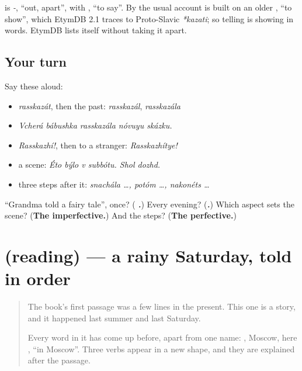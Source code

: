 \begin{cousinweb}
\textbf{} is \emph{-}, \textquotedblleft{}out, apart\textquotedblright{}, with \textbf{}, \textquotedblleft{}to say\textquotedblright{}. By the usual account \emph{} is built on an older \emph{}, \textquotedblleft{}to show\textquotedblright{}, which EtymDB 2.1 traces to Proto-Slavic \emph{*kazati}; so telling is showing in words. EtymDB lists \emph{} itself without taking it apart.
\end{cousinweb}

\subsection*{Your turn}
Say these aloud:

\begin{itemize}
\raggedright
  \item \emph{rasskazát}, then the past: \emph{rasskazál}, \emph{rasskazála}
  \item \emph{Vcherá bábushka rasskazála nóvuyu skázku.}
  \item \emph{Rasskazhí!}, then to a stranger: \emph{Rasskazhítye!}
  \item a scene: \emph{Éto býlo v subbótu. Shol dozhd.}
  \item three steps after it: \emph{snachála …, potóm …, nakonéts …}
\end{itemize}

\begin{tcolorbox}[breakable,colback=teal!4,colframe=teal!35!black,title={Before you move on}]
\textquotedblleft{}Grandma told a fairy tale\textquotedblright{}, once? (\emph{\textbf{  .}}) Every evening? (\emph{\textbf{.}}) Which aspect sets the scene? (\textbf{The imperfective.}) And the steps? (\textbf{The perfective.})
\end{tcolorbox}
\section[(reading)]{(reading) — a rainy Saturday, told in order}

\label{lesson:RU-C262-chtenie}



\begin{quote}
The book's first passage was a few lines in the present. This one is a story, and it happened last summer and last Saturday.

Every word in it has come up before, apart from one name: \emph{}, Moscow, here \emph{ }, \textquotedblleft{}in Moscow\textquotedblright{}. Three verbs appear in a new shape, and they are explained after the passage.
\end{quote}

